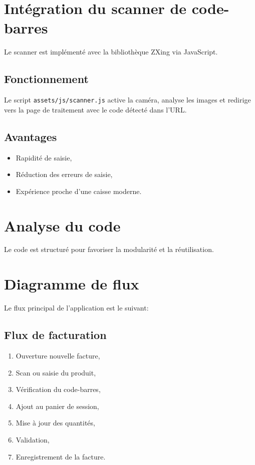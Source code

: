 \documentclass[12pt,a4paper]{article}
\begin{document}
\section{Intégration du scanner de code-barres}
Le scanner est implémenté avec la bibliothèque ZXing via JavaScript.

\subsection{Fonctionnement}
Le script \texttt{assets/js/scanner.js} active la caméra, analyse les images et redirige vers la page de traitement avec le code détecté dans l'URL.

\subsection{Avantages}
\begin{itemize}
  \item Rapidité de saisie,
  \item Réduction des erreurs de saisie,
  \item Expérience proche d'une caisse moderne.
\end{itemize}

\section{Analyse du code}
Le code est structuré pour favoriser la modularité et la réutilisation.

\section{Diagramme de flux}
Le flux principal de l'application est le suivant:

\subsection{Flux de facturation}
\begin{enumerate}
  \item Ouverture nouvelle facture,
  \item Scan ou saisie du produit,
  \item Vérification du code-barres,
  \item Ajout au panier de session,
  \item Mise à jour des quantités,
  \item Validation,
  \item Enregistrement de la facture.
\end{enumerate}
\end{document}
